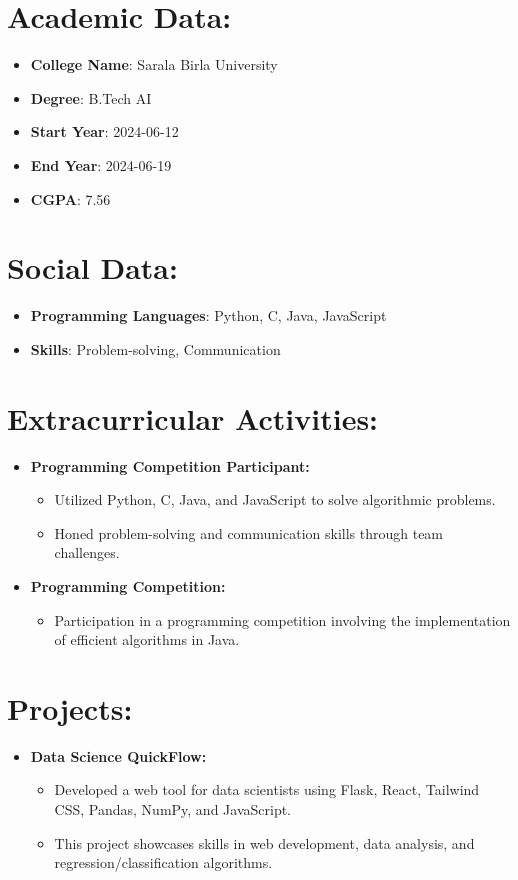 \documentclass{article}
\begin{document}
\section*{Academic Data:}
\begin{itemize}
  \item \textbf{College Name}: Sarala Birla University
  \item \textbf{Degree}: B.Tech AI
  \item \textbf{Start Year}: 2024-06-12
  \item \textbf{End Year}: 2024-06-19
  \item \textbf{CGPA}: 7.56
\end{itemize}

\section*{Social Data:}
\begin{itemize}
  \item \textbf{Programming Languages}: Python, C, Java, JavaScript
  \item \textbf{Skills}: Problem-solving, Communication
\end{itemize}

\section*{Extracurricular Activities:}
\begin{itemize}
  \item \textbf{Programming Competition Participant:}
    \begin{itemize}
      \item Utilized Python, C, Java, and JavaScript to solve algorithmic problems.
      \item Honed problem-solving and communication skills through team challenges.
    \end{itemize}
  \item \textbf{Programming Competition:}
    \begin{itemize}
      \item Participation in a programming competition involving the implementation of efficient algorithms in Java.
    \end{itemize}
\end{itemize}

\section*{Projects:}
\begin{itemize}
  \item \textbf{Data Science QuickFlow:}
    \begin{itemize}
      \item Developed a web tool for data scientists using Flask, React, Tailwind CSS, Pandas, NumPy, and JavaScript.
      \item This project showcases skills in web development, data analysis, and regression/classification algorithms.
    \end{itemize}
\end{itemize}
\end{document}
